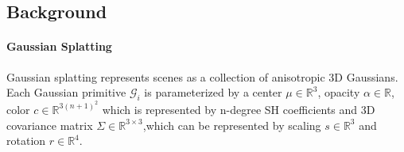 
\subsection{Background}
\paragraph{Gaussian Splatting}
Gaussian splatting represents scenes as a collection of anisotropic 3D Gaussians. Each Gaussian primitive $\mathcal{G}_i$ is parameterized by a center $\mu \in \mathbb{R}^3$, opacity $\alpha \in \mathbb{R}$, color $c \in \mathbb{R}^{3(n+1)^2}$ which is represented by n-degree SH coefficients and 3D covariance matrix $\Sigma \in \mathbb{R}^{3 \times 3}$,which can be represented by scaling $s\in \mathbb{R}^3$ and rotation $r\in \mathbb{R}^4$.

